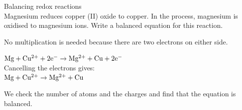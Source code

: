 \begin{wex}{Balancing redox reactions\\}{Magnesium reduces copper (II) oxide to copper. In the process, magnesium is oxidised to magnesium ions. Write a balanced equation for this reaction.\\}
{No multiplication is needed because there are two electrons on either side.\\

\begin{center}
$\rm{Mg + Cu^{2+} + 2e^{-} \rightarrow Mg^{2+} + Cu + 2e^{-}}$ \\
Cancelling the electrons gives:\\
$\rm{Mg + Cu^{2+} \rightarrow Mg^{2+} + Cu}$
\end{center}

We check the number of atoms and the charges and find that the equation is balanced.
}
\end{wex}


